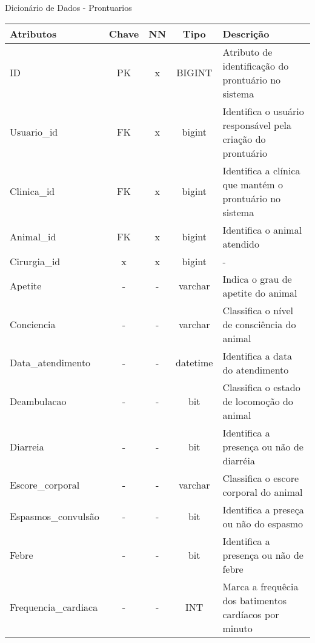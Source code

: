 \documentclass[
    12pt,               %
    openright,          %
    oneside,
    a4paper,            %
    BIBLATEX,           %
    TODO,               %
    english,            %
    brazil              %
    ]{ifsp-spo-inf-ctds}
\begin{document}
            \begin{center}
                \begin{quadro}[H]
              
                  \caption{Dicionário de Dados - Prontuarios}
                  \begin{tabulary}{1.0\textwidth}{|p{11em}|c|c|c|p{17em}|}
                  \hline
                  Atributos & Chave & NN & Tipo & Descrição\\
                  \hline
                  ID & PK & x & BIGINT & Atributo de identificação do prontuário no sistema \\
                  \hline
                  Usuario\_id & FK & x & bigint & Identifica o usuário responsável pela criação do prontuário \\
                  \hline
                  Clinica\_id & FK & x & bigint & Identifica a clínica que mantém o prontuário no sistema\\
                  \hline
                  Animal\_id & FK & x & bigint & Identifica o animal atendido \\
                  \hline
                  Cirurgia\_id & x & x & bigint & -\\
                  \hline
                  Apetite & - & - & varchar & Indica o grau de apetite do animal\\
                  \hline
                  Conciencia & - & - & varchar & Classifica o nível de consciência do animal\\
                  \hline
                  Data\_atendimento & - & - & datetime & Identifica a data do atendimento\\
                  \hline
                  Deambulacao & - & - & bit & Classifica o estado de locomoção do animal\\
                  \hline
                  Diarreia & - & - & bit & Identifica a presença ou não de diarréia\\
                  \hline
                  Escore\_corporal & - & - & varchar & Classifica o escore corporal do animal\\
                  \hline
                  Espasmos\_convulsão  & - & - & bit &  Identifica a preseça ou não do espasmo\\
                  \hline
                  Febre & - & - & bit & Identifica a presença ou não de febre \\
                  \hline
                  Frequencia\_cardiaca & - & - & INT & Marca a frequêcia dos batimentos cardíacos por minuto\\

\end{tabulary}
\end{quadro}
\end{center}
\end{document}
